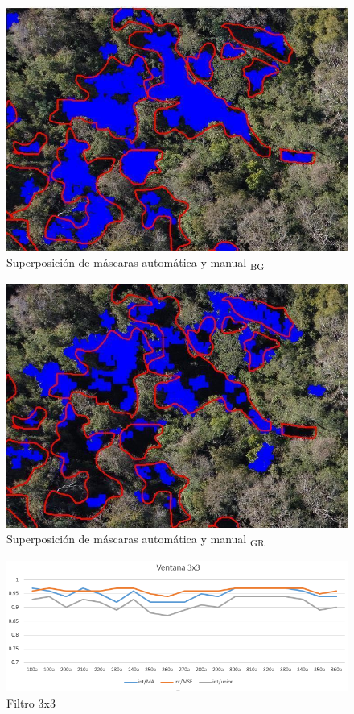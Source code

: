  \begin{figure}[H]
    \includegraphics[width=\textwidth]{Imagenes/blue minus green 85.png}
     \hfill
     \caption{Superposición de máscaras automática y manual \textpsi\textsubscript{BG}}
    \label{azulverde}
 \end{figure}

 \begin{figure}[H]
    \includegraphics[width=\textwidth]{Imagenes/green minus red 85.png}
     \hfill
     \caption{Superposición de máscaras automática y manual \textpsi\textsubscript{GR}}
    \label{verderojo}
 
\end{figure}

\begin{figure}[H]
    \includegraphics[width=\textwidth]{Imagenes/filter 3x3.png}
     \hfill
     \caption{Filtro 3x3}
    \label{filter3x3}
\end{figure}

